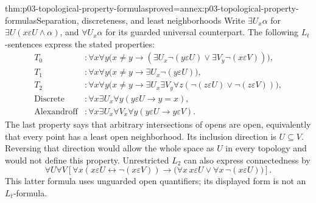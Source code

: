 \begin{hbtheorem}{thm:p03-topological-property-formulas}{proved=annex:p03-topological-property-formulas}{Separation, discreteness, and least neighborhoods}
Write \(\exists U_x\alpha\) for
\(\exists U(x\varepsilon U\land\alpha)\), and
\(\forall U_x\alpha\) for its guarded universal counterpart.
The following \(L_t\)-sentences express the stated properties:
\[
\begin{aligned}
 T_0 &: \forall x\forall y\bigl(x\ne y\to
           (\exists U_x\neg(y\varepsilon U)\lor
            \exists V_y\neg(x\varepsilon V))\bigr),\\
 T_1 &: \forall x\forall y\bigl(x\ne y\to
                                  \exists U_x\neg(y\varepsilon U)\bigr),\\
 T_2 &: \forall x\forall y\bigl(x\ne y\to
        \exists U_x\exists V_y\forall z
                           (\neg(z\varepsilon U)\lor\neg(z\varepsilon V))\bigr),\\
 \mathrm{Discrete} &: \forall x\exists U_x\forall y
                                     (y\varepsilon U\to y=x),\\
 \mathrm{Alexandroff} &: \forall x\exists U_x\forall V_x\forall y
                                     (y\varepsilon U\to y\varepsilon V).
\end{aligned}
\]
The last property says that arbitrary intersections of opens are open,
equivalently that every point has a least open neighborhood. Its inclusion
direction is \(U\subseteq V\). Reversing that direction would allow the
whole space as \(U\) in every topology and would not define this property.
Unrestricted \(L_2\) can also express connectedness by
\[
 \forall U\forall V\left[
   \forall x(x\varepsilon U\leftrightarrow\neg(x\varepsilon V))
    \to\bigl(\forall x\,x\varepsilon U\lor
              \forall x\,\neg(x\varepsilon U)\bigr)\right].
\]
This latter formula uses unguarded open quantifiers; its displayed form
is not an \(L_t\)-formula.
\end{hbtheorem}

